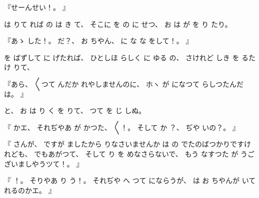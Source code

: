
『せーんせい！。
』

は
りて
れば
の
は
き
て、
%
そこに
を
の
に
せつ、
%
お
は
が
を
り
たり。

『あゝ
した！。
%
だ{}？、
%
お
ちやん、
%
に
な
な
をして！。
』

を
ばずして
に
げたれば、
%
ひとしほ
らしく
に
ゆる
の、
%
さけれど
しき
を
るたけ
りて、

『あら、
%
〳〵つて
んだか
れやしませんのに、
%
ホヽ
が
になつて
らしつたんだは。
』

と、
%
お
は
り%
く
を
りて、
%
つて
を
じ
しぬ。

『
かエ、
%
それぢやあ
が
かつた、
%
〳〵！。%
%
そして
か
？、
%
ぢや
いの？。
』

『
さんが、
%
ですが
ましたから
りなさいませんか
は
の
でたのばつかりですけれども、
%
でもあがつて、
%
そして
り
を
めなさらないで、
%
もう
なすつた
が
うございましやうツて！。
』

『
！。
%
そりやあ
り
う！。
%
それぢや
へ
つて
にならうが、
%
は
お
ちやんが
いて
れるのかエ。
』

